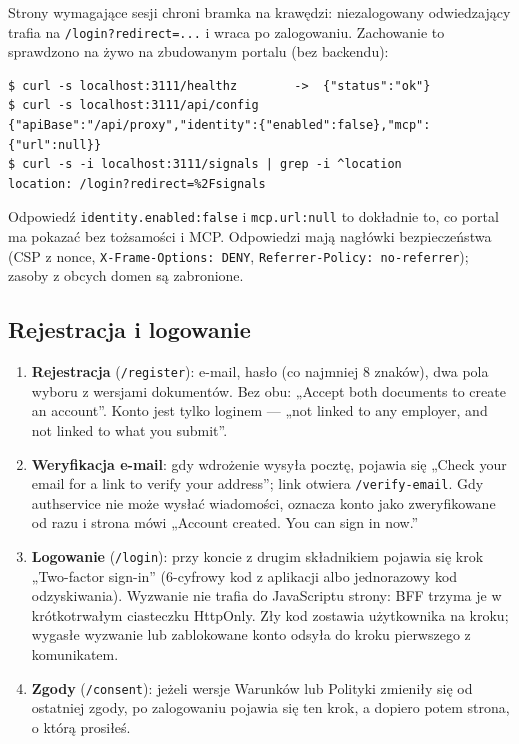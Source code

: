 {Strony wymagające sesji chroni bramka na krawędzi: niezalogowany odwiedzający
trafia na \texttt{/\allowbreak{}login?redirect=...} i wraca po zalogowaniu. Zachowanie to
sprawdzono na żywo na zbudowanym portalu (bez backendu):

\begin{Verbatim}[fontsize=\scriptsize,frame=single,framesep=2mm]
$ curl -s localhost:3111/healthz        ->  {"status":"ok"}
$ curl -s localhost:3111/api/config
{"apiBase":"/api/proxy","identity":{"enabled":false},"mcp":{"url":null}}
$ curl -s -i localhost:3111/signals | grep -i ^location
location: /login?redirect=%2Fsignals
\end{Verbatim}

Odpowiedź \texttt{identity.enabled:false} i \texttt{mcp.url:null} to dokładnie to,
co portal ma pokazać bez tożsamości i MCP. Odpowiedzi mają nagłówki bezpieczeństwa
(CSP z nonce, \texttt{X-Frame-Options: DENY}, \texttt{Referrer-Policy: no-referrer});
zasoby z obcych domen są zabronione.

\subsection{Rejestracja i logowanie}

\begin{enumerate}[leftmargin=*,itemsep=2pt]
  \item \textbf{Rejestracja} (\texttt{/register}): e-mail, hasło (co najmniej
        8 znaków), dwa pola wyboru z wersjami dokumentów. Bez obu: „Accept
        both documents to create an account”. Konto jest tylko loginem ---
        „not linked to any employer, and not linked to what you submit”.
  \item \textbf{Weryfikacja e-mail}: gdy wdrożenie wysyła pocztę, pojawia się
        „Check your email for a link to verify your address”; link otwiera
        \texttt{/verify-email}. Gdy authservice nie może wysłać wiadomości,
        oznacza konto jako zweryfikowane od razu i strona mówi „Account created.
        You can sign in now.”
  \item \textbf{Logowanie} (\texttt{/login}): przy koncie z drugim składnikiem
        pojawia się krok „Two-factor sign-in” (6-cyfrowy kod z aplikacji albo
        jednorazowy kod odzyskiwania). Wyzwanie nie trafia do JavaScriptu strony:
        BFF trzyma je w krótkotrwałym ciasteczku HttpOnly. Zły kod zostawia
        użytkownika na kroku; wygasłe wyzwanie lub zablokowane konto odsyła do
        kroku pierwszego z komunikatem.
  \item \textbf{Zgody} (\texttt{/consent}): jeżeli wersje Warunków lub
        Polityki zmieniły się od ostatniej zgody, po zalogowaniu pojawia się ten
        krok, a dopiero potem strona, o którą prosiłeś.
\end{enumerate}

}
